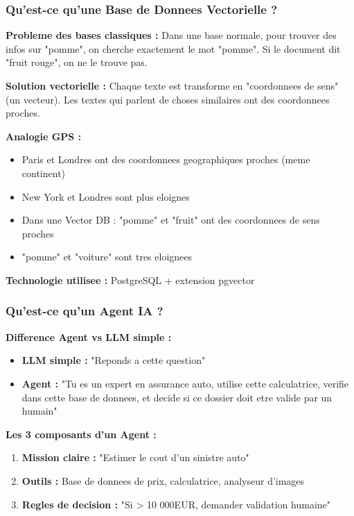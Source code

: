 \documentclass[a4paper,12pt]{article}
\begin{document}
\subsubsection{Qu'est-ce qu'une Base de Donnees Vectorielle ?}
\textbf{Probleme des bases classiques :} Dans une base normale, pour trouver des infos sur "pomme", on cherche exactement le mot "pomme". Si le document dit "fruit rouge", on ne le trouve pas.

\textbf{Solution vectorielle :} Chaque texte est transforme en "coordonnees de sens" (un vecteur). Les textes qui parlent de choses similaires ont des coordonnees proches.

\textbf{Analogie GPS :} 
\begin{itemize}
    \item Paris et Londres ont des coordonnees geographiques proches (meme continent)
    \item New York et Londres sont plus eloignes
    \item Dans une Vector DB : "pomme" et "fruit" ont des coordonnees de sens proches
    \item "pomme" et "voiture" sont tres eloignees
\end{itemize}

\textbf{Technologie utilisee :} PostgreSQL + extension pgvector

\subsubsection{Qu'est-ce qu'un Agent IA ?}
\textbf{Difference Agent vs LLM simple :}
\begin{itemize}
    \item \textbf{LLM simple :} "Reponds a cette question"
    \item \textbf{Agent :} "Tu es un expert en assurance auto, utilise cette calculatrice, verifie dans cette base de donnees, et decide si ce dossier doit etre valide par un humain"
\end{itemize}

\textbf{Les 3 composants d'un Agent :}
\begin{enumerate}
    \item \textbf{Mission claire :} "Estimer le cout d'un sinistre auto"
    \item \textbf{Outils :} Base de donnees de prix, calculatrice, analyseur d'images
    \item \textbf{Regles de decision :} "Si > 10 000EUR, demander validation humaine"
\end{enumerate}
\end{document}
